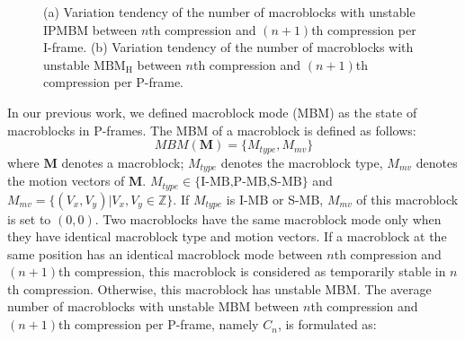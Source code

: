 \documentclass[journal,sort]{IEEEtran}
\begin{document}
\begin{figure}[ht!]
	\centering
	\caption{(a) Variation tendency of the number of macroblocks with unstable IPMBM between $n$th compression and $(n+1)$th compression per I-frame. 
		(b) Variation tendency of the number of macroblocks with unstable $\text{MBM}_\text{H}$ between $n$th compression and $(n+1)$th compression per P-frame.
	}
	\label{fig:statistics_h264}
\end{figure}
 
In our previous work, we defined macroblock mode (MBM) as the state of macroblocks in P-frames. The MBM of a macroblock is defined as follows:
\begin{equation}
MBM(\mathbf{M}) = \{M_{type},M_{mv}\} \label{mbm-define}
\end{equation}
where $\mathbf{M}$ denotes a macroblock; $M_{type}$ denotes the macroblock type, $M_{mv}$ denotes the motion vectors of $\mathbf{M}$. $M_{type}\in \{\text{I-MB,P-MB,S-MB}\}$ and $M_{mv}=\{(V_x,V_y)|V_x,V_y\in \mathbb{Z}\}$. If $M_{type}$ is I-MB or S-MB, $M_{mv}$ of this macroblock is set to $(0,0)$. Two macroblocks have the same macroblock mode only when they have identical macroblock type and motion vectors. If a macroblock at the same position has an identical macroblock mode between $n$th compression and $(n+1)$th compression, this macroblock is considered as temporarily stable in $n$th compression. Otherwise, this macroblock has unstable MBM. The average number of macroblocks with unstable MBM between $n$th compression and $(n+1)$th compression per P-frame, namely $C_n$, is formulated as:
\end{document}
